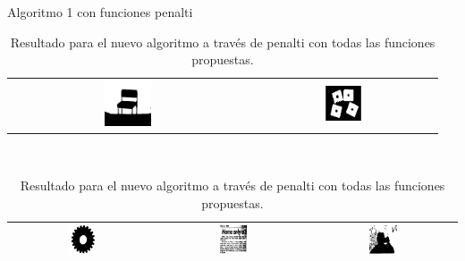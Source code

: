\documentclass{beamer}
\theoremstyle{plain} %
\theoremstyle{definition}
\begin{document}
\begin{frame}{Algoritmo 1 con funciones penalti}
  \begin{table}
  \centering
  \begin{tabular}{cc}\hline
  \includegraphics[width=0.2\textwidth]{img/res/e2a/alg1agregate-chair.jpg} &
  \includegraphics[width=0.2\textwidth]{img/res/e2a/alg1agregate-block.jpg} &
  \end{tabular}\\
  \begin{tabular}{ccc}
  \includegraphics[width=0.2\textwidth]{img/res/e2a/alg1agregate-02.jpg} &
  \includegraphics[width=0.2\textwidth]{img/res/e2a/alg1agregate-09.jpg} &
  \includegraphics[width=0.2\textwidth]{img/res/e2a/alg1agregate-07.jpg}\\\hline
  \end{tabular}
  \caption{Resultado para el nuevo algoritmo a través de penalti con todas las funciones propuestas.\label{tab:resultexp2imagenagregado}}
  \end{table}
\end{frame}
\end{document}
